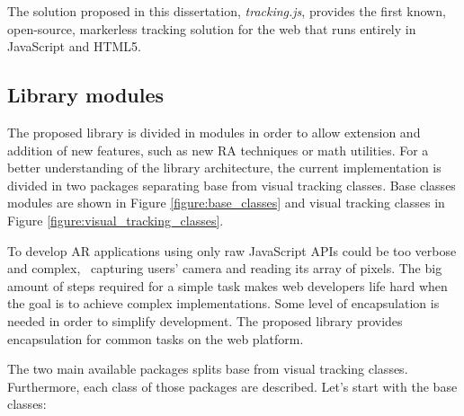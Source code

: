 The solution proposed in this dissertation, \textit{tracking.js}, provides the first known, open-source, markerless tracking solution for the web that runs entirely in JavaScript and HTML5.


\subsection{Library modules} %
\label{sub:tracking_library_for_the_web:library_modules}

The proposed library is divided in modules in order to allow extension and addition of new features, such as new RA techniques or math utilities. For a better understanding of the library architecture, the current implementation is divided in two packages separating base from visual tracking classes. Base classes modules are shown in Figure \ref{figure:base_classes} and visual tracking classes in Figure \ref{figure:visual_tracking_classes}.

To develop AR applications using only raw JavaScript APIs \cite{MDN2013} could be too verbose and complex, \eg\ capturing users' camera and reading its array of pixels. The big amount of steps required for a simple task makes web developers life hard when the goal is to achieve complex implementations. Some level of encapsulation is needed in order to simplify development. The proposed library provides encapsulation for common tasks on the web platform.

The two main available packages splits base from visual tracking classes. Furthermore, each class of those packages are described. Let's start with the base classes:

